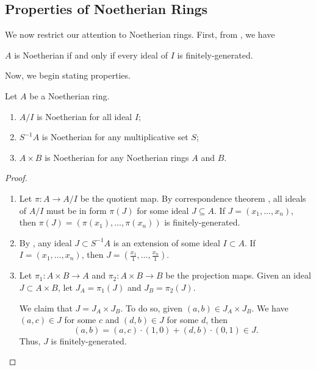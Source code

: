 \subsection{Properties of Noetherian Rings}
We now restrict our attention to Noetherian rings.
First, from , we have
\begin{corollary}
$A$ is Noetherian
if and only if every ideal of $I$ is finitely-generated.
\end{corollary}
Now, we begin stating properties.
\begin{proposition}
    \label{prop:noetherian_ring_properties}
    Let $A$ be a Noetherian ring.
    \begin{enumerate}[label=(\alph*)]
    \item $A/I$ is Noetherian for all ideal $I$;
    \item $S^{-1}A$ is Noetherian for any multiplicative set $S$;
    \item $A\times B$ is Noetherian for any Noetherian rings
    $A$ and $B$.
    \end{enumerate}
\end{proposition}
\begin{proof}
    \begin{enumerate}[label=(\alph*)]
    \item
    Let $\pi : A\to A/I$ be the quotient map.
    By correspondence theorem ,
    all ideals of $A/I$ must be in form $\pi(J)$ 
    for some ideal $J\subseteq A$.
    If $J = (x_1,\dots,x_n)$,
    then $\pi(J) = (\pi(x_1),\dots,\pi(x_n))$ is finitely-generated.
    \item
    By ,
    any ideal $J\subset S^{-1}A$ is an extension
    of some ideal $I\subset A$.
    If $I=(x_1,\dots,x_n)$, then
    $J = \left(\frac{x_1}1, \dots,\frac{x_n}1\right)$.
    \item 
    Let $\pi_1 : A\times B\to A$ and $\pi_2 : A\times B\to B$
    be the projection maps.
    Given an ideal $J\subset A\times B$,
    let $J_A = \pi_1(J)$ and $J_B = \pi_2(J)$.

    We claim that $J = J_A\times J_B$.
    To do so,
    given $(a,b)\in J_A\times J_B$.
    We have $(a,c)\in J$ for some $c$
    and $(d,b)\in J$ for some $d$, then
    $$(a,b) = (a,c)\cdot (1,0) + (d,b)\cdot (0,1)\in J.$$
    Thus, $J$ is finitely-generated.
    \qedhere
    \end{enumerate}
\end{proof}
